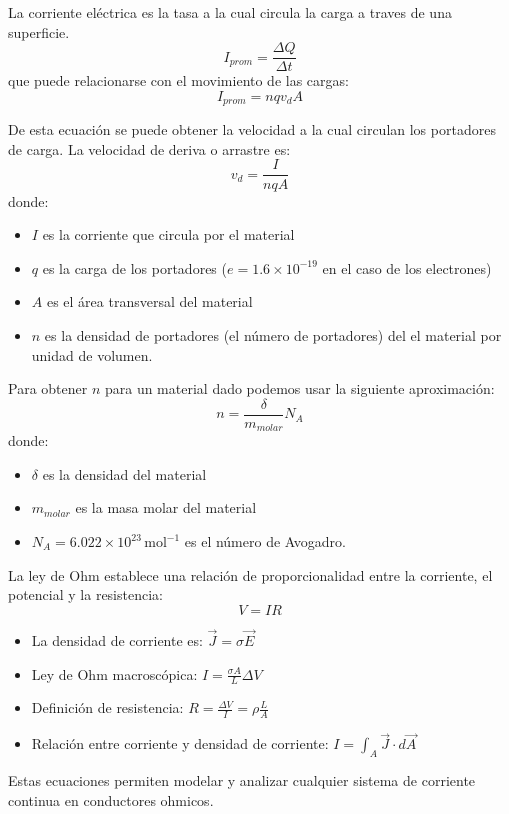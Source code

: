 \begin{tcolorbox}[resumen,title=Corriente Eléctrica]
  La corriente eléctrica es la tasa a la cual circula la carga a traves de una superficie.
  \[
    I_{prom} = \frac{\Delta Q}{\Delta t}
  \]
  que puede relacionarse con el movimiento de las cargas:
  \[
    I_{prom} = n q v_d A
  \]

  De esta ecuación se puede obtener la velocidad a la cual circulan los portadores de carga. La velocidad de deriva o arrastre es:
  \[
    v_d = \frac{I}{nqA}
  \]
  donde:
  \begin{itemize}
    \item \(I\) es la corriente que circula por el material
    \item \(q\) es la carga de los portadores (\(e=1.6\times10^{-19}\) en el caso de los electrones)
    \item \(A\) es el área transversal del material
    \item \(n\) es la densidad de portadores (el número de portadores) del el material por unidad de volumen.
  \end{itemize}

  Para obtener \(n\) para un material dado podemos usar la siguiente aproximación:
  \[
    n=\frac{\delta}{m_{molar}} N_A
  \]
  donde:
  \begin{itemize}
    \item \(\delta\) es la densidad del material
    \item \(m_{molar}\) es la masa molar del material
    \item \(N_A = 6.022 \times 10^{23} \, \mathrm{mol}^{-1}\) es el número de Avogadro.
  \end{itemize}
\end{tcolorbox}

\begin{tcolorbox}[resumen,title=Ley de Ohm]
  La ley de Ohm establece una relación de proporcionalidad entre la corriente, el potencial y la resistencia:
  \[
    V = IR
  \]
  \begin{itemize}
    \item La densidad de corriente es: \(\vec{J} = \sigma \vec{E}\)
    \item Ley de Ohm macroscópica: \(I = \frac{\sigma A}{L} \Delta V\)
    \item Definición de resistencia: \(R = \frac{\Delta V}{I} = \rho \frac{L}{A}\)
    \item Relación entre corriente y densidad de corriente: \(I = \int_A \vec{J} \cdot d\vec{A}\)
  \end{itemize}
  Estas ecuaciones permiten modelar y analizar cualquier sistema de corriente continua en conductores ohmicos.
\end{tcolorbox}


